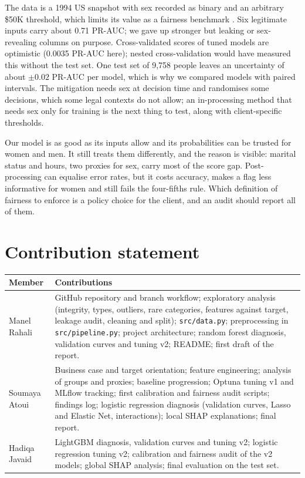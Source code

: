 \documentclass[11pt,a4paper]{article}
\newcommand{\code}[1]{\texttt{#1}}
\begin{document}
The data is a 1994 US snapshot with sex recorded as binary and an arbitrary \$50K threshold, which limits its value as a fairness benchmark \cite{ding2021}. Six legitimate inputs carry about 0.71 PR-AUC; we gave up stronger but leaking or sex-revealing columns on purpose. Cross-validated scores of tuned models are optimistic (0.0035 PR-AUC here); nested cross-validation would have measured this without the test set. One test set of 9{,}758 people leaves an uncertainty of about $\pm 0.02$ PR-AUC per model, which is why we compared models with paired intervals. The mitigation needs sex at decision time and randomises some decisions, which some legal contexts do not allow; an in-processing method that needs sex only for training is the next thing to test, along with client-specific thresholds.

Our model is as good as its inputs allow and its probabilities can be trusted for women and men. It still treats them differently, and the reason is visible: marital status and hours, two proxies for sex, carry most of the score gap. Post-processing can equalise error rates, but it costs accuracy, makes a flag less informative for women and still fails the four-fifths rule. Which definition of fairness to enforce is a policy choice for the client, and an audit should report all of them.

\section*{Contribution statement}

\begin{table}[H]
\centering\small
\begin{tabularx}{\textwidth}{@{}lX@{}}
\toprule
Member & Contributions \\
\midrule
Manel Rahali & GitHub repository and branch workflow; exploratory analysis (integrity, types, outliers, rare categories, features against target, leakage audit, cleaning and split); \code{src/data.py}; preprocessing in \code{src/pipeline.py}; project architecture; random forest diagnosis, validation curves and tuning v2; README; first draft of the report. \\
Soumaya Atoui & Business case and target orientation; feature engineering; analysis of groups and proxies; baseline progression; Optuna tuning v1 and MLflow tracking; first calibration and fairness audit scripts; findings log; logistic regression diagnosis (validation curves, Lasso and Elastic Net, interactions); local SHAP explanations; final report. \\
Hadiqa Javaid & LightGBM diagnosis, validation curves and tuning v2; logistic regression tuning v2; calibration and fairness audit of the v2 models; global SHAP analysis; final evaluation on the test set. \\
\bottomrule
\end{tabularx}
\end{table}
\end{document}
